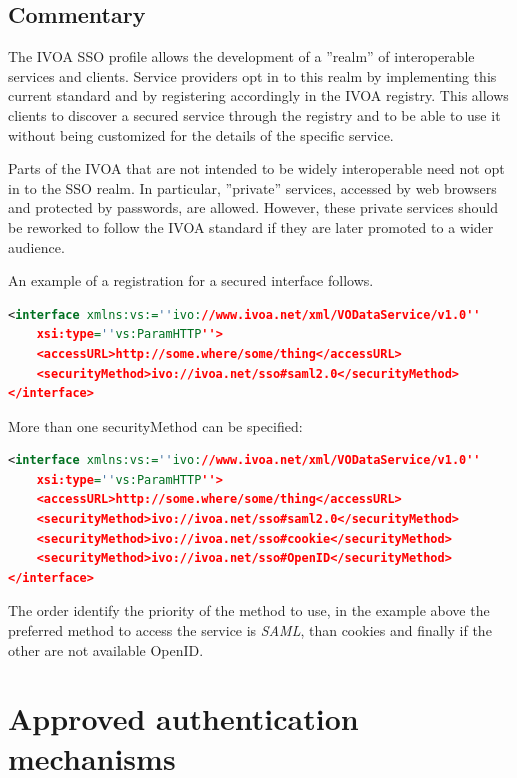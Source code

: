 \documentclass[11pt,a4paper]{ivoa}
\begin{document}
\subsection{Commentary}
The IVOA SSO profile allows the development of a ''realm'' of interoperable services and clients. 
Service providers opt in to this realm by implementing this current standard and by registering accordingly in the IVOA registry. 
This allows clients to discover a secured service through the registry and to be able to use it without 
being customized for the details of the specific service.

Parts of the IVOA that are not intended to be widely interoperable need not opt in to the SSO realm. 
In particular, ''private'' services, accessed by web browsers and protected by passwords, are allowed. 
However, these private services should be reworked to follow the IVOA standard if they are later promoted to a wider audience.

An example of a registration for a secured interface follows.
\begin{lstlisting}[language=XML]
<interface xmlns:vs:=''ivo://www.ivoa.net/xml/VODataService/v1.0''  
	xsi:type=''vs:ParamHTTP''>
	<accessURL>http://some.where/some/thing</accessURL>
	<securityMethod>ivo://ivoa.net/sso#saml2.0</securityMethod>
</interface> 
\end{lstlisting}

More than one {\xmlel securityMethod} can be specified:
\begin{lstlisting}[language=XML]
<interface xmlns:vs:=''ivo://www.ivoa.net/xml/VODataService/v1.0''  
	xsi:type=''vs:ParamHTTP''>
	<accessURL>http://some.where/some/thing</accessURL>
	<securityMethod>ivo://ivoa.net/sso#saml2.0</securityMethod>
	<securityMethod>ivo://ivoa.net/sso#cookie</securityMethod>
	<securityMethod>ivo://ivoa.net/sso#OpenID</securityMethod>
</interface> 
\end{lstlisting}

The order identify the priority of the method to use, in the example above the preferred method to access 
the service is {\em SAML}, than {cookies} and finally if the other are not available OpenID.

\section{Approved authentication mechanisms}
\end{document}
